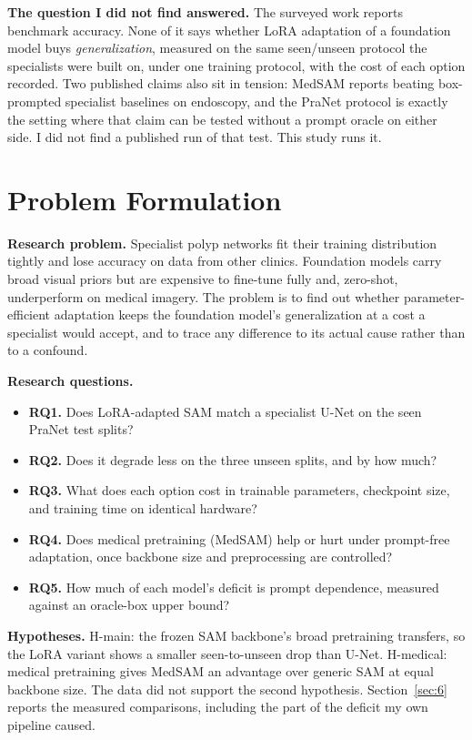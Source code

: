 \documentclass[conference]{IEEEtran}
\begin{document}
\textbf{The question I did not find answered.} The surveyed work reports benchmark accuracy. None of it says whether LoRA adaptation of a foundation model buys \textit{generalization}, measured on the same seen/unseen protocol the specialists were built on, under one training protocol, with the cost of each option recorded. Two published claims also sit in tension: MedSAM reports beating box-prompted specialist baselines on endoscopy, and the PraNet protocol is exactly the setting where that claim can be tested without a prompt oracle on either side. I did not find a published run of that test. This study runs it.


\section{Problem Formulation}\label{sec:3}
\textbf{Research problem.} Specialist polyp networks fit their training distribution tightly and lose accuracy on data from other clinics. Foundation models carry broad visual priors but are expensive to fine-tune fully and, zero-shot, underperform on medical imagery. The problem is to find out whether parameter-efficient adaptation keeps the foundation model's generalization at a cost a specialist would accept, and to trace any difference to its actual cause rather than to a confound.

\textbf{Research questions.}

\begin{itemize}
\item \textbf{RQ1.} Does LoRA-adapted SAM match a specialist U-Net on the seen PraNet test splits?
\item \textbf{RQ2.} Does it degrade less on the three unseen splits, and by how much?
\item \textbf{RQ3.} What does each option cost in trainable parameters, checkpoint size, and training
time on identical hardware?

\item \textbf{RQ4.} Does medical pretraining (MedSAM) help or hurt under prompt-free adaptation, once
backbone size and preprocessing are controlled?

\item \textbf{RQ5.} How much of each model's deficit is prompt dependence, measured against an
oracle-box upper bound?

\end{itemize}
\textbf{Hypotheses.} H-main: the frozen SAM backbone's broad pretraining transfers, so the LoRA variant shows a smaller seen-to-unseen drop than U-Net. H-medical: medical pretraining gives MedSAM an advantage over generic SAM at equal backbone size. The data did not support the second hypothesis. Section~\ref{sec:6} reports the measured comparisons, including the part of the deficit my own pipeline caused.
\end{document}
